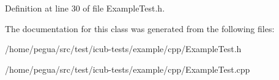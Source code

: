 Definition at line 30 of file Example\-Test.\-h.



The documentation for this class was generated from the following files\-:\begin{DoxyCompactItemize}
\item 
/home/pegua/src/test/icub-\/tests/example/cpp/Example\-Test.\-h\item 
/home/pegua/src/test/icub-\/tests/example/cpp/Example\-Test.\-cpp\end{DoxyCompactItemize}
